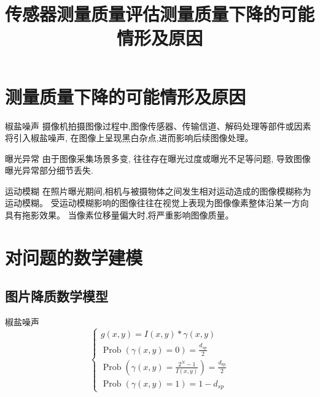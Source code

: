 \documentclass{beamer}
\title{传感器测量质量评估}
\author{}
\begin{document}
\maketitle

\tableofcontents

\section{测量质量下降的可能情形及原因}
\begin{frame}
  \title{测量质量下降的可能情形及原因}
  \begin{block}{椒盐噪声}
  摄像机拍摄图像过程中,图像传感器、传输信道、解码处理等部件或因素将引入椒盐噪声,  在图像上呈现黑白杂点,进而影响后续图像处理。
  \end{block}
\end{frame}

\begin{frame}
  \begin{block}{曝光异常}
    由于图像采集场景多变,
    往往存在曝光过度或曝光不足等问题,
    导致图像曝光异常部分细节丢失.
  \end{block}
\end{frame}

\begin{frame}
  \begin{block}{运动模糊}
  在照片曝光期间,相机与被摄物体之间发生相对运动造成的图像模糊称为运动模糊。
  受运动模糊影响的图像往往在视觉上表现为图像像素整体沿某一方向具有拖影效果。
  当像素位移量偏大时,将严重影响图像质量。
  \end{block}
\end{frame}

\section{对问题的数学建模}
\subsection{图片降质数学模型}
\begin{frame}
  \begin{block}{椒盐噪声}
  \begin{equation}
    \label{eq:01}
  \left\{\begin{array}{l}
g(x, y)=I(x, y) * \gamma(x, y) \\
\operatorname{Prob}(\gamma(x, y)=0)=\frac{d_{s p}}{2} \\
\operatorname{Prob}\left(\gamma(x, y)=\frac{2^{N}-1}{I(x, y)}\right)=\frac{d_{\operatorname{sp}}}{2} \\
\operatorname{Prob}(\gamma(x, y)=1)=1-d_{s p}
\end{array}\right.
  \end{equation}
  \end{block}
\end{frame}
\end{document}
